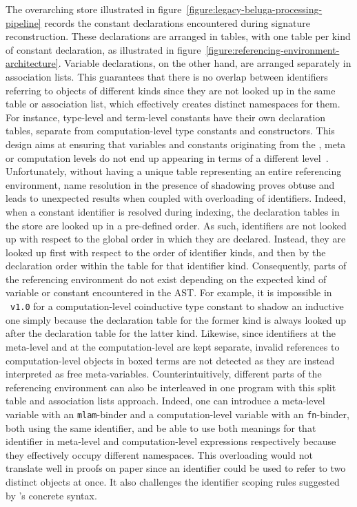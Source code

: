 The overarching store illustrated in figure~\ref{figure:legacy-beluga-processing-pipeline} records the constant declarations encountered during signature reconstruction.
These declarations are arranged in tables, with one table per kind of constant declaration, as illustrated in figure~\ref{figure:referencing-environment-architecture}.
Variable declarations, on the other hand, are arranged separately in association lists.
This guarantees that there is no overlap between identifiers referring to objects of different kinds since they are not looked up in the same table or association list, which effectively creates distinct namespaces for them.
For instance, \LF type-level and term-level constants have their own declaration tables, separate from computation-level type constants and constructors.
This design aims at ensuring that variables and constants originating from the \LF, meta or computation levels do not end up appearing in terms of a different level~\cite{germain2010implementation}.
Unfortunately, without having a unique table representing an entire referencing environment, name resolution in the presence of shadowing proves obtuse and leads to unexpected results when coupled with overloading of identifiers.
Indeed, when a constant identifier is resolved during indexing, the declaration tables in the store are looked up in a pre-defined order.
As such, identifiers are not looked up with respect to the global order in which they are declared.
Instead, they are looked up first with respect to the order of identifier kinds, and then by the declaration order within the table for that identifier kind.
Consequently, parts of the referencing environment do not exist depending on the expected kind of variable or constant encountered in the \ac{AST}.
For example, it is impossible in \Beluga~\texttt{v1.0} for a computation-level coinductive type constant to shadow an inductive one simply because the declaration table for the former kind is always looked up after the declaration table for the latter kind.
Likewise, since identifiers at the meta-level and at the computation-level are kept separate, invalid references to computation-level objects in boxed terms are not detected as they are instead interpreted as free meta-variables.
Counterintuitively, different parts of the referencing environment can also be interleaved in one program with this split table and association lists approach.
Indeed, one can introduce a meta-level variable with an \verb|mlam|-binder and a computation-level variable with an \verb|fn|-binder, both using the same identifier, and be able to use both meanings for that identifier in meta-level and computation-level expressions respectively because they effectively occupy different namespaces.
This overloading would not translate well in proofs on paper since an identifier could be used to refer to two distinct objects at once.
It also challenges the identifier scoping rules suggested by \Beluga's concrete syntax.

